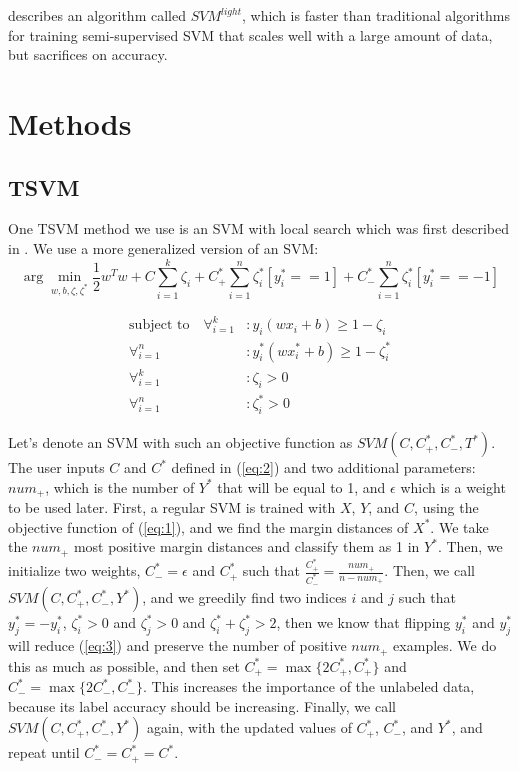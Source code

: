 \documentclass[11pt]{article}
\begin{document}
\cite{joachims1999making} describes an algorithm called $SVM^{light}$,
which is faster than traditional algorithms for training
semi-supervised SVM that scales well with a large amount of
data, but sacrifices on accuracy.

\section{Methods}

\subsection{TSVM}

One TSVM method we use is an SVM with local search which was first described in \cite{Joachims:1999}. We use a more generalized version of an SVM:
\begin{equation}\label{eq:3}
\arg\min_{w, b, \zeta,\zeta^*} \frac{1}{2}w^Tw+C\sum_{i=1}^k\zeta_i+C^*_+\sum_{i=1}^n\zeta^*_i[y^*_i == 1]+C^*_-\sum_{i=1}^n\zeta^*_i[y^*_i == -1]
\end{equation}

\begin{align*}
\textrm{subject to}\quad \forall_{i=1}^k&: y_i(wx_i+b)\geq 1-\zeta_i \\
\forall_{i=1}^n&: y^*_i(wx^*_i+b)\geq 1-\zeta^*_i \\
\forall_{i=1}^k&: \zeta_i>0 \\
\forall_{i=1}^n&: \zeta^*_i>0
\end{align*}

Let's denote an SVM with such an objective function as $SVM(C,C^*_+,C^*_-,T^*)$.
The user inputs $C$ and $C^*$ defined in (\ref{eq:2}) and two additional parameters: $num_+$, which is the number of $Y^*$ that will be equal to 1, and $\epsilon$ which is a weight to be used later. First, a regular SVM is trained with $X$, $Y$, and $C$, using the objective function of (\ref{eq:1}), and we find the margin distances of $X^*$. We take the $num_+$ most positive margin distances and classify them as 1 in $Y^*$. Then, we initialize two weights, $C^*_- = \epsilon$ and $C^*_+$ such that $\frac{C^*_+}{C^*_-} = \frac{num_+}{n-num_+}$. Then, we call $SVM(C,C^*_+,C^*_-,Y^*)$, and we greedily find two indices $i$ and $j$ such that $y^*_j = -y^*_i$, $\zeta^*_i > 0$ and $\zeta^*_j > 0$ and $\zeta^*_i+\zeta^*_j > 2$, then we know that flipping $y^*_i$ and $y^*_j$ will reduce (\ref{eq:3}) and preserve the number of positive $num_+$ examples. We do this as much as possible, and then set $C^*_+ = \max\{2C^*_+, C^*_+\}$ and $C^*_- = \max\{2C^*_-, C^*_-\}$. This increases the importance of the unlabeled data, because its label accuracy should be increasing. Finally, we call $SVM(C,C^*_+,C^*_-,Y^*)$ again, with the updated values of $C^*_+$, $C^*_-$, and $Y^*$, and repeat until $C^*_- = C^*_+ = C^*$.
\end{document}
